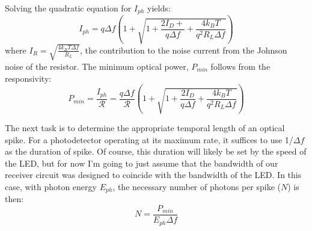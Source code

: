 \documentclass[twocolumn]{article}
\begin{document}
Solving the quadratic equation for $I_{ph}$ yields:
\begin{equation}
    I_{ph} = q\Delta f(1+\sqrt{1+\frac{2I_D+}{q\Delta f} +
    \frac{4k_BT}{q^2R_L\Delta f}})
\end{equation}
where $I_R = \sqrt{\frac{4k_{B}T\Delta f}{R_{L}}}$, the contribution to the noise current from the Johnson noise of the resistor. The minimum optical power, $P_{min}$ follows from the responsivity:
\begin{equation}
    P_{min} = \frac{I_{ph}}{\mathcal{R}}=
    \frac{q\Delta f}{\mathcal{R}}(1+\sqrt{1+\frac{2I_D}{q\Delta f} +
    \frac{4k_BT}{q^2R_L\Delta f}})
\end{equation}

The next task is to determine the appropriate temporal length of an optical spike. For a photodetector operating at its maximum rate, it suffices to use 1/$\Delta f$ as the duration of spike. Of course, this duration will likely be set by the speed of the LED, but for now I'm going to just assume that the bandwidth of our receiver circuit was designed to coincide with the bandwidth of the LED. In this case, with photon energy $E_{ph}$, the necessary number of photons per spike ($N$) is then:
\begin{equation}
    N = \frac{P_{min}}{E_{ph}\Delta f}
\end{equation}
\end{document}
